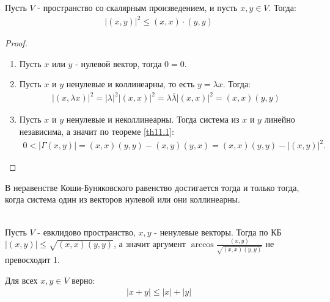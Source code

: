 \begin{theorem}
    Пусть $V$ - пространство со скалярным произведением, и пусть $x, y \in V$. Тогда: 
    \begin{gather*}
        |(x, y)|^2 \leq (x, x) \cdot (y, y)
    \end{gather*}
\end{theorem}

\begin{proof}~
    \begin{enumerate}
        \item Пусть $x$ или $y$ - нулевой вектор, тогда $0 = 0$.
        \item Пусть $x$ и $y$ ненулевые и коллинеарны, то есть $y = \lambda x$. Тогда: 
        \begin{gather*}
            |(x, \lambda x)|^2 = |\lambda|^2 |(x, x)|^2 = \lambda \overline{\lambda} |(x, x)|^2 = 
            (x, x) (y, y)
        \end{gather*}
        \item Пусть $x$ и $y$ ненулевые и неколлинеарны. Тогда система из $x$ и $y$ линейно независима, а значит 
        по теореме \ref{th11.1}:
        \begin{gather*}
            0 < |\Gamma(x, y)| = (x, x)(y, y) - (x, y)(y, x) = (x, x)(y, y) - |(x, y)|^2.
        \end{gather*}
    \end{enumerate}
\end{proof}

\begin{corollary}
    В неравенстве Коши-Буняковского равенство достигается тогда и только тогда, когда система один из 
    векторов нулевой или они коллинеарны.
\end{corollary}

\begin{corollary}~ \\
    Пусть $V$ - евклидово пространство, $x, y$ - ненулевые векторы. Тогда по КБ 
    $|(x, y)| \leq \sqrt{(x, x)(y, y)}$, а значит аргумент $\arccos \frac{(x, y)}{\sqrt{(x, x)(y, y)}}$
    не превосходит 1.
\end{corollary}

\begin{corollary}
    Для всех $x, y \in V$ верно:
    \begin{gather*}
        |x + y| \leq |x| + |y|
    \end{gather*}
\end{corollary}

